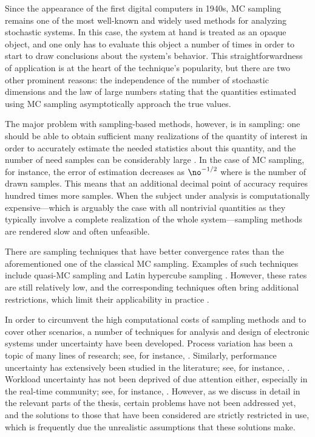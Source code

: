 Since the appearance of the first digital computers in 1940s, \ac{MC} sampling
remains one of the most well-known and widely used methods for analyzing
stochastic systems. In this case, the system at hand is treated as an opaque
object, and one only has to evaluate this object a number of times in order to
start to draw conclusions about the system's behavior. This straightforwardness
of application is at the heart of the technique's popularity, but there are two
other prominent reasons: the independence of the number of stochastic dimensions
and the law of large numbers \cite{durrett2010} stating that the quantities
estimated using \ac{MC} sampling asymptotically approach the true values.

The major problem with sampling-based methods, however, is in sampling: one
should be able to obtain sufficient many realizations of the quantity of
interest in order to accurately estimate the needed statistics about this
quantity, and the number of need samples can be considerably large
\cite{diaz-emparanza2002}. In the case of \ac{MC} sampling, for instance, the
error of estimation decreases as $\no^{-1/2}$ where \no is the number of drawn
samples. This means that an additional decimal point of accuracy requires
hundred times more samples. When the subject under analysis is computationally
expensive---which is arguably the case with all nontrivial quantities as they
typically involve a complete realization of the whole system---sampling methods
are rendered slow and often unfeasible.

There are sampling techniques that have better convergence rates than the
aforementioned one of the classical \ac{MC} sampling. Examples of such
techniques include quasi-\ac{MC} sampling and Latin hypercube sampling
\cite{asmussen2007}. However, these rates are still relatively low, and the
corresponding techniques often bring additional restrictions, which limit their
applicability in practice \cite{xiu2010}.

In order to circumvent the high computational costs of sampling methods and to
cover other scenarios, a number of techniques for analysis and design of
electronic systems under uncertainty have been developed. Process variation has
been a topic of many lines of research; see, for instance, \cite{bhardwaj2006,
bhardwaj2008, chandra2010, juan2012, lee2013}. Similarly, performance
uncertainty has extensively been studied in the literature; see, for instance,
\cite{coskun2006, huang2009b, das2014c}. Workload uncertainty has not been
deprived of due attention either, especially in the real-time community; see,
for instance, \cite{diaz2002, santinelli2011, quinton2012, tanasa2015}. However,
as we discuss in detail in the relevant parts of the thesis, certain problems
have not been addressed yet, and the solutions to those that have been
considered are strictly restricted in use, which is frequently due the
unrealistic assumptions that these solutions make.
